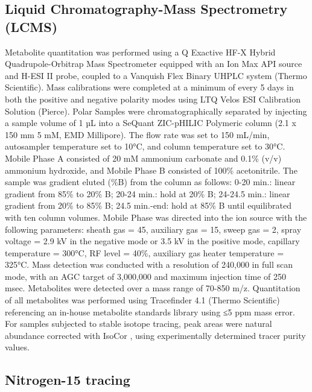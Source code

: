 \subsection{Liquid Chromatography-Mass Spectrometry (LCMS)}
Metabolite quantitation was performed using a Q Exactive HF-X Hybrid Quadrupole-Orbitrap Mass Spectrometer equipped with an Ion Max API source and H-ESI II probe, coupled to a Vanquish Flex Binary UHPLC system (Thermo Scientific).
Mass calibrations were completed at a minimum of every 5 days in both the positive and negative polarity modes using LTQ Velos ESI Calibration Solution (Pierce).
Polar Samples were chromatographically separated by injecting a sample volume of 1 µL into a SeQuant ZIC-pHILIC Polymeric column (2.1 x 150 mm 5 mM, EMD Millipore).
The flow rate was set to 150 mL/min, autosampler temperature set to 10°C, and column temperature set to 30°C.
Mobile Phase A consisted of 20 mM ammonium carbonate and 0.1\% (v/v) ammonium hydroxide, and Mobile Phase B consisted of 100\% acetonitrile.
The sample was gradient eluted (\%B) from the column as follows: 0-20 min.: linear gradient from 85\% to 20\% B; 20-24 min.: hold at 20\% B; 24-24.5 min.: linear gradient from 20\% to 85\% B; 24.5 min.-end: hold at 85\% B until equilibrated with ten column volumes.
Mobile Phase was directed into the ion source with the following parameters: sheath gas = 45, auxiliary gas = 15, sweep gas = 2, spray voltage = 2.9 kV in the negative mode or 3.5 kV in the positive mode, capillary temperature = 300°C, RF level = 40\%, auxiliary gas heater temperature = 325°C.
Mass detection was conducted with a resolution of 240,000 in full scan mode, with an AGC target of 3,000,000 and maximum injection time of 250 msec.
Metabolites were detected over a mass range of 70-850 m/z.
Quantitation of all metabolites was performed using Tracefinder 4.1 (Thermo Scientific) referencing an in-house metabolite standards library using ≤5 ppm mass error.
For samples subjected to stable isotope tracing, peak areas were natural abundance corrected with IsoCor \cite{Millard2019-hv}, using experimentally determined tracer purity values.



\subsection{Nitrogen-15 tracing}

